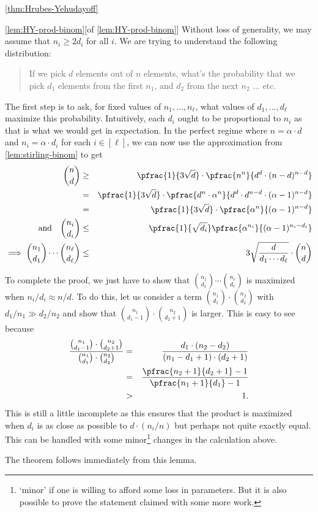 \begin{proofof}{\autoref{thm:Hrubes-Yehudayoff}}
\begin{myproof}{\autoref{lem:HY-prod-binom}}[of \autoref{lem:HY-prod-binom}]
Without loss of generality, we may assume that $n_i \geq 2d_i$ for all $i$. We are trying to understand the following distribution:
\begin{quote}
  If we pick $d$ elements out of $n$ elements, what's the probability that we pick $d_1$ elements from the first $n_1$, and $d_2$ from the next $n_2$ ... etc. 
\end{quote}
The first step is to ask, for fixed values of $n_1, \ldots, n_\ell$, what values of $d_1, \ldots, d_\ell$ maximize this probability. Intuitively, each $d_i$ ought to be proportional to $n_i$ as that is what we would get in expectation. In the perfect regime where $n = \alpha \cdot  d$ and  $n_i = \alpha \cdot d_i$ for each $i \in [\ell]$, we can now use the approximation from \autoref{lem:stirling-binom} to get
\begin{eqnarray*}
\binom{n}{d} & \geq  &  \pfrac{1}{3\sqrt{d}} \cdot \pfrac{n^n}{d^d \cdot (n-d)^{n-d}}\\
 & = & \pfrac{1}{3\sqrt{d}} \cdot \pfrac{d^n \cdot \alpha^n}{d^d \cdot d^{n-d} \cdot (\alpha - 1)^{n-d}}\\
 & = & \pfrac{1}{3\sqrt{d}} \cdot \pfrac{\alpha^n}{(\alpha - 1)^{n-d}}\\
\text{and} \quad\binom{n_i}{d_i} & \leq  &  \pfrac{1}{\sqrt{d_i}} \pfrac{\alpha^{n_i}}{(\alpha - 1)^{n_i-d_i}}\\
\implies \binom{n_1}{d_1} \cdots \binom{n_\ell}{d_\ell}  & \leq & 3 \sqrt{\frac{d}{d_1 \cdots d_\ell}} \cdot \binom{n}{d}
\end{eqnarray*}

To complete the proof, we just have to show that $\binom{n_1}{d_1} \cdots \binom{n_\ell}{d_\ell}$ is maximized when $n_i/d_i \approx n/d$.
To do this, let us consider a term $\binom{n_1}{d_1} \cdot \binom{n_2}{d_2}$ with $d_1/n_1 \gg d_2/n_2$ and show that $\binom{n_1}{d_1 - 1} \cdot \binom{n_2}{d_2 + 1}$ is larger.
This is easy to see because
\begin{eqnarray*}
\frac{\binom{n_1}{d_1 - 1} \cdot \binom{n_2}{d_2 + 1}}{\binom{n_1}{d_1} \cdot \binom{n_2}{d_2}} & = & \frac{d_1 \cdot (n_2 - d_2)}{(n_1 - d_1 + 1) \cdot (d_2 + 1)}\\
 & = & \frac{\pfrac{n_2 + 1}{d_2 + 1} - 1 }{\pfrac{n_1 + 1}{d_1} - 1}\\
 & > & 1.
\end{eqnarray*}
This is still a little incomplete as this ensures that the product is maximized when $d_i$ is as close as possible to $d \cdot (n_i/n)$ but perhaps not quite exactly equal. This can be handled with some minor\footnote{`minor' if one is willing to afford some loss in parameters. But it is also possible to prove the statement claimed with some more work.} changes in the calculation above.  
\end{myproof}

\noindent
The theorem follows immediately from this lemma. 
\end{proofof}

